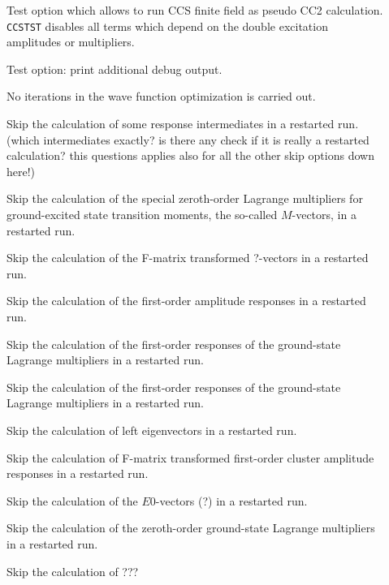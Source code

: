 \begin{description}
\item[] 
   Test option which allows to run CCS finite field as pseudo CC2
   calculation. \verb+CCSTST+ disables all terms which depend on the
   double excitation amplitudes or multipliers.
%
\item[]  
   Test option: print additional debug output.
%
\item[]
   No iterations in the wave function optimization is carried out.
%
%
\item[] 
   Skip the calculation of some response intermediates
   in a restarted run.
    (which intermediates exactly?
    is there any check if it is really a restarted calculation?
    this questions applies also for all the other skip options
    down here!) 
%
\item[] 
   Skip the calculation of the special zeroth-order Lagrange 
   multipliers for ground-excited state transition moments,
   the so-called $M$-vectors, in a restarted run.
%
\item[] 
   Skip the calculation of the F-matrix transformed ?-vectors
   in a restarted run.
%
\item[] 
   Skip the calculation of the first-order amplitude responses
   in a restarted run.
%
\item[] 
   Skip the calculation of the first-order responses of the 
   ground-state Lagrange multipliers in a restarted run.
%
\item[] 
   Skip the calculation of the first-order responses of the 
   ground-state Lagrange multipliers in a restarted run.
%
\item[]  
   Skip the calculation of left eigenvectors
   in a restarted run.
%
\item[] 
   Skip the calculation of F-matrix transformed first-order
   cluster amplitude responses in a restarted run.
%
\item[] 
   Skip the calculation of the $E0$-vectors (?)
   in a restarted run.
%
\item[]  
   Skip the calculation of the zeroth-order ground-state Lagrange
   multipliers in a restarted run.
%
\item[] 
   Skip the calculation of ???

\end{description}
